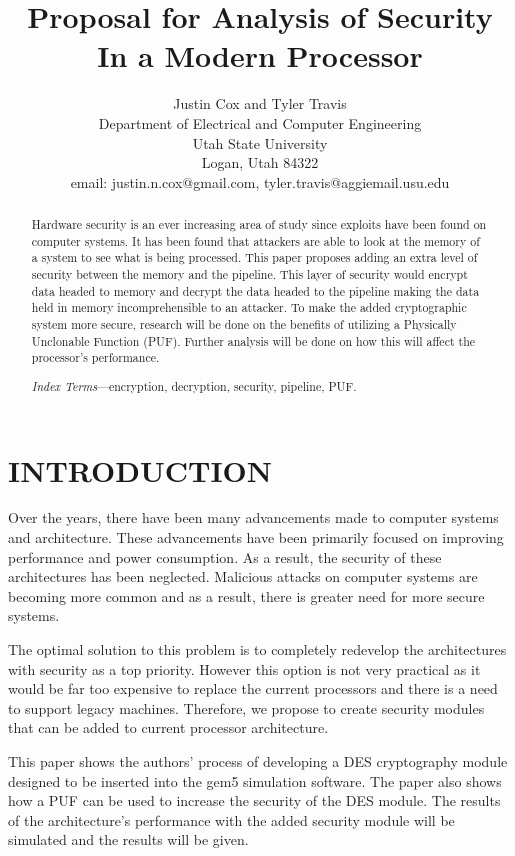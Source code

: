 \documentclass[letterpaper, 10 pt, conference]{ieeeconf}  %
\title{\LARGE \bf
Proposal for Analysis of Security In a Modern Processor
}
\author{Justin Cox and Tyler Travis
\\ \small{Department of Electrical and Computer Engineering}
\\ \small{Utah State University}
\\ \small{Logan, Utah 84322}
\\ \small{email: justin.n.cox@gmail.com, tyler.travis@aggiemail.usu.edu}
}
\begin{document}
\maketitle
\thispagestyle{empty}
\pagestyle{empty}


\begin{abstract}

Hardware security is an ever increasing area of study since exploits have been found on computer systems. It has been found that attackers are able to look at the memory of a system to see what is being processed. This paper proposes adding an extra level of security between the memory and the pipeline. This layer of security would encrypt data headed to memory and decrypt the data headed to the pipeline making the data held in memory incomprehensible to an attacker. To make the added cryptographic system more secure, research will be done on the benefits of utilizing a Physically Unclonable Function (PUF). Further analysis will be done on how this will affect the processor's performance.

\emph{Index Terms}---encryption, decryption, security, pipeline, PUF.

\end{abstract}

\section{INTRODUCTION}

Over the years, there have been many advancements made to computer systems and architecture. These advancements have been primarily focused on improving performance and power consumption. As a result, the security of these architectures has been neglected. Malicious attacks on computer systems are becoming more common and as a result, there is greater need for more secure systems.

The optimal solution to this problem is to completely redevelop the architectures with security as a top priority. However this option is not very practical as it would be far too expensive to replace the current processors and there is a need to support legacy machines. Therefore, we propose to create security modules that can be added to current processor architecture.

This paper shows the authors' process of developing a DES cryptography module designed to be inserted into the gem5 simulation software.  The paper also shows how a PUF can be used to increase the security of the DES module.  The results of the architecture's performance with the added security module will be simulated and the results will be given. 
\end{document}
